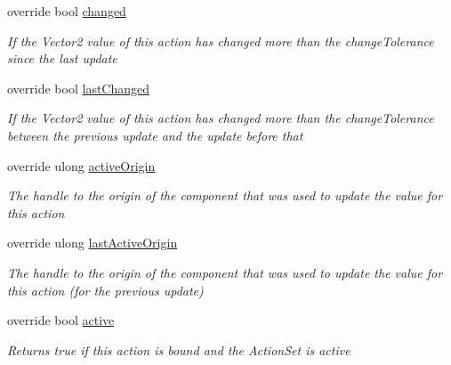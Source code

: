 \begin{DoxyCompactItemize}
override bool \mbox{\hyperlink{class_valve_1_1_v_r_1_1_steam_v_r___action___vector2___source_a74003e139808d4ebcdfec2d9f6d7c249}{changed}}
\begin{DoxyCompactList}\small\item\em If the Vector2 value of this action has changed more than the change\+Tolerance since the last update \end{DoxyCompactList}\item 
override bool \mbox{\hyperlink{class_valve_1_1_v_r_1_1_steam_v_r___action___vector2___source_a3e6454ab7f3a17f060cc13cee5b47791}{last\+Changed}}
\begin{DoxyCompactList}\small\item\em If the Vector2 value of this action has changed more than the change\+Tolerance between the previous update and the update before that \end{DoxyCompactList}\item 
override ulong \mbox{\hyperlink{class_valve_1_1_v_r_1_1_steam_v_r___action___vector2___source_ad0ae7a67b2ca4de1123546f1dd23cf69}{active\+Origin}}
\begin{DoxyCompactList}\small\item\em The handle to the origin of the component that was used to update the value for this action \end{DoxyCompactList}\item 
override ulong \mbox{\hyperlink{class_valve_1_1_v_r_1_1_steam_v_r___action___vector2___source_aefafa6d818b7ee85cc6e020b5140f24e}{last\+Active\+Origin}}
\begin{DoxyCompactList}\small\item\em The handle to the origin of the component that was used to update the value for this action (for the previous update) \end{DoxyCompactList}\item 
override bool \mbox{\hyperlink{class_valve_1_1_v_r_1_1_steam_v_r___action___vector2___source_a62d7f456b87326d35e39714739dbe83a}{active}}
\begin{DoxyCompactList}\small\item\em Returns true if this action is bound and the Action\+Set is active \end{DoxyCompactList}\item 

\end{DoxyCompactItemize}
